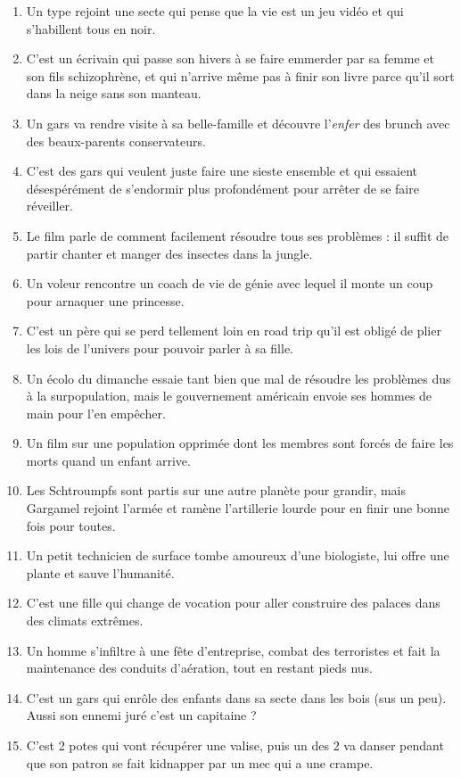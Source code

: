 \begin{enumerate}
\def\labelenumi{\arabic{enumi}.}
\tightlist
\item
  Un type rejoint une secte qui pense que la vie est un jeu vidéo et qui
  s'habillent tous en noir.
\item
  C'est un écrivain qui passe son hivers à se faire emmerder par sa
  femme et son fils schizophrène, et qui n'arrive même pas à finir son
  livre parce qu'il sort dans la neige sans son manteau.
\item
  Un gars va rendre visite à sa belle-famille et découvre l'\emph{enfer}
  des brunch avec des beaux-parents conservateurs.
\item
  C'est des gars qui veulent juste faire une sieste ensemble et qui
  essaient désespérément de s'endormir plus profondément pour arrêter de
  se faire réveiller.
\item
  Le film parle de comment facilement résoudre tous ses problèmes : il
  suffit de partir chanter et manger des insectes dans la jungle.
\item
  Un voleur rencontre un coach de vie de génie avec lequel il monte un
  coup pour arnaquer une princesse.
\item
  C'est un père qui se perd tellement loin en road trip qu'il est obligé
  de plier les lois de l'univers pour pouvoir parler à sa fille.
\item
  Un écolo du dimanche essaie tant bien que mal de résoudre les
  problèmes dus à la surpopulation, mais le gouvernement américain
  envoie ses hommes de main pour l'en empêcher.
\item
  Un film sur une population opprimée dont les membres sont forcés de
  faire les morts quand un enfant arrive.
\item
  Les Schtroumpfs sont partis sur une autre planète pour grandir, mais
  Gargamel rejoint l'armée et ramène l'artillerie lourde pour en finir
  une bonne fois pour toutes.
\item
  Un petit technicien de surface tombe amoureux d'une biologiste, lui
  offre une plante et sauve l'humanité.
\item
  C'est une fille qui change de vocation pour aller construire des
  palaces dans des climats extrêmes.
\item
  Un homme s'infiltre à une fête d'entreprise, combat des terroristes et
  fait la maintenance des conduits d'aération, tout en restant pieds
  nus.
\item
  C'est un gars qui enrôle des enfants dans sa secte dans les bois (sus
  un peu). Aussi son ennemi juré c'est un capitaine ?
\item
  C'est 2 potes qui vont récupérer une valise, puis un des 2 va danser
  pendant que son patron se fait kidnapper par un mec qui a une crampe.
\end{enumerate}

